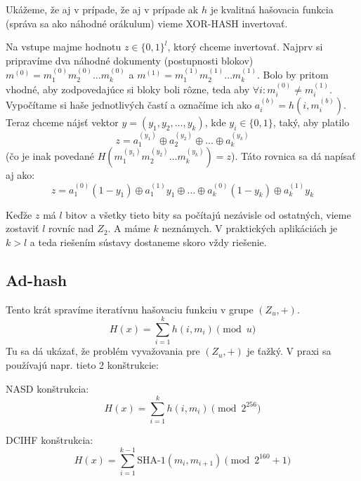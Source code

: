Ukážeme, že aj v prípade, že aj v prípade ak $h$ je kvalitná hašovacia funkcia
(správa sa ako náhodné orákulum) vieme XOR-HASH invertovať.

Na vstupe majme hodnotu $z \in \{0,1\}^l$, ktorý chceme invertovať.
Najprv si pripravíme dva náhodné dokumenty (postupnosti blokov)
$m^{(0)} = m_1^{(0)} m_2^{(0)} \dots m_k^{(0)}$ a 
$m^{(1)} = m_1^{(1)} m_2^{(1)} \dots m_k^{(1)}$. Bolo by pritom
vhodné, aby zodpovedajúce si bloky boli rôzne, teda aby $\forall i:
m_i^{(0)} \ne m_i^{(1)}$.
Vypočítame si haše jednotlivých častí a označíme ich ako
$a_i^{(b)} = h(i, m_i^{(b)})$. 
Teraz chceme nájsť vektor $y = (y_1,y_2, \dots ,y_k)$, kde $y_i \in \{0,1\}$,
taký, aby platilo 
\begin{equation*}
    z = a_1^{(y_1)} \oplus a_2^{(y_2)} \oplus \dots \oplus a_k^{(y_k)}
\end{equation*}
(čo je inak povedané $H(m_1^{(y_1)} m_2^{(y_2)} \dots m_k^{(y_k)}) = z$).
Táto rovnica sa dá napísať aj ako:
\begin{equation*}
    z = a_1^{(0)} (1 - y_1) \oplus a_1^{(1)} y_1 \oplus \dots 
        \oplus a_k^{(0)} (1 - y_k) \oplus a_k^{(1)} y_k
\end{equation*}

Keďže $z$ má $l$ bitov a všetky tieto bity sa počítajú nezávisle od
ostatných, vieme zostaviť $l$ rovníc nad $Z_2$. 
A máme $k$ neznámych.
V praktických aplikáciách je $k > l$ 
a teda riešením sústavy dostaneme skoro vždy riešenie.


\subsection{Ad-hash}

Tento krát spravíme iteratívnu hašovaciu funkciu v grupe $(Z_u, +)$.
\begin{equation*}
    H(x) = \sum_{i=1}^k h(i, m_i) \pmod{u}
\end{equation*}
Tu sa dá ukázať, že problém vyvažovania pre $(Z_u, +)$ je ťažký. 
V praxi sa používajú napr. tieto 2 konštrukcie:

NASD konštrukcia:
\begin{equation*}
    H(x) = \sum_{i=1}^k h(i, m_i) \pmod{2^{256}}
\end{equation*}

DCIHF konštrukcia:
\begin{equation*}
    H(x) = \sum_{i=1}^{k-1} \textrm{SHA-1}(m_i, m_{i+1}) \pmod{2^{160}+1}
\end{equation*}

